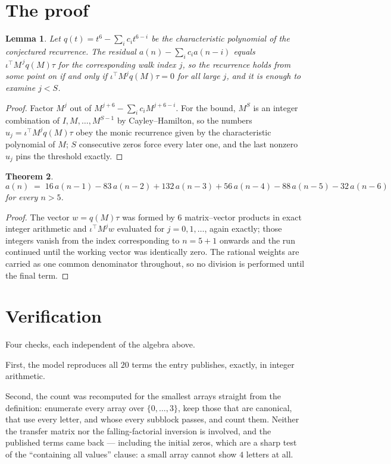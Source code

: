 \documentclass[11pt,a4paper]{article}
\theoremstyle{plain}
\newtheorem{theorem}{Theorem}
\newtheorem{lemma}[theorem]{Lemma}
\theoremstyle{definition}
\begin{document}
\section{The proof}

\begin{lemma}\label{lem:crit}
Let $q(t)=t^{6}-\sum_i c_it^{6-i}$ be the characteristic polynomial of the
conjectured recurrence. The residual $a(n)-\sum_ic_ia(n-i)$ equals
$\iota^{\!\top}M^{\,j}q(M)\tau$ for the corresponding walk index $j$, so the recurrence
holds from some point on if and only if $\iota^{\!\top}M^{j}q(M)\tau=0$ for all large $j$,
and it is enough to examine $j<S$.
\end{lemma}

\begin{proof}
Factor $M^{j}$ out of $M^{j+6}-\sum_ic_iM^{j+6-i}$. For the bound, $M^{S}$
is an integer combination of $I,M,\dots,M^{S-1}$ by Cayley--Hamilton, so the numbers
$u_j=\iota^{\!\top}M^{j}q(M)\tau$ obey the monic recurrence given by the characteristic
polynomial of $M$; $S$ consecutive zeros force every later one, and the last nonzero $u_j$
pins the threshold exactly.
\end{proof}

\begin{theorem}
\[
a(n)\;=\;16\,a(n-1) - 83\,a(n-2) + 132\,a(n-3) + 56\,a(n-4) - 88\,a(n-5) - 32\,a(n-6)
\]
for every $n>5$.
\end{theorem}

\begin{proof}
The vector $w=q(M)\tau$ was formed by $6$ matrix--vector products in exact integer
arithmetic and $\iota^{\!\top}M^{j}w$ evaluated for $j=0,1,\dots$, again exactly; those
integers vanish from the index corresponding to $n=5+1$ onwards and the run continued
until the working vector was identically zero. The rational weights are carried as one common
denominator throughout, so no division is performed until the final term.
\end{proof}

\section{Verification}

Four checks, each independent of the algebra above.

First, the model reproduces all $20$ terms the entry publishes, exactly, in integer
arithmetic.

Second, the count was recomputed for the smallest arrays straight from the definition:
enumerate every array over $\{0,\dots,3\}$, keep those that are canonical, that use every
letter, and whose every subblock passes, and count them. Neither the transfer matrix nor the
falling-factorial inversion is involved, and the published terms came back --- including the
initial zeros, which are a sharp test of the ``containing all values'' clause: a small array
cannot show $4$ letters at all.
\end{document}
